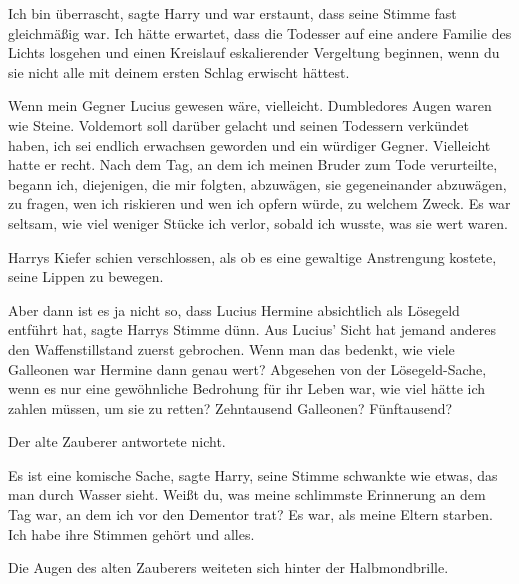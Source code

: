 \glqq{}Ich bin überrascht\grqq{}, sagte Harry und war erstaunt, dass seine Stimme
fast gleichmäßig war. \glqq{}Ich hätte erwartet, dass die Todesser auf eine
andere Familie des Lichts losgehen und einen Kreislauf eskalierender Vergeltung
beginnen, wenn du sie nicht alle mit deinem ersten Schlag erwischt
hättest.\grqq{}

\glqq{}Wenn mein Gegner Lucius gewesen wäre, vielleicht.\grqq{} Dumbledores Augen
waren wie Steine. \glqq{}Voldemort soll darüber gelacht und seinen Todessern
verkündet haben, ich sei endlich erwachsen geworden und ein würdiger Gegner.
Vielleicht hatte er recht. Nach dem Tag, an dem ich meinen Bruder zum Tode
verurteilte, begann ich, diejenigen, die mir folgten, abzuwägen, sie
gegeneinander abzuwägen, zu fragen, wen ich riskieren und wen ich opfern würde,
zu welchem Zweck. Es war seltsam, wie viel weniger Stücke ich verlor, sobald ich
wusste, was sie wert waren.\grqq{}

Harrys Kiefer schien verschlossen, als ob es eine gewaltige Anstrengung kostete,
seine Lippen zu bewegen.

\glqq{}Aber dann ist es ja nicht so, dass Lucius Hermine absichtlich als Lösegeld
entführt hat\grqq{}, sagte Harrys Stimme dünn. \glqq{}Aus Lucius' Sicht hat
jemand anderes den Waffenstillstand zuerst gebrochen. Wenn man das bedenkt, wie
viele Galleonen war Hermine dann genau wert? Abgesehen von der Lösegeld-Sache,
wenn es nur eine gewöhnliche Bedrohung für ihr Leben war, wie viel hätte ich
zahlen müssen, um sie zu retten? Zehntausend Galleonen? Fünftausend?\grqq{}

Der alte Zauberer antwortete nicht.

\glqq{}Es ist eine komische Sache\grqq{}, sagte Harry, seine Stimme schwankte wie
etwas, das man durch Wasser sieht. \glqq{}Weißt du, was meine schlimmste
Erinnerung an dem Tag war, an dem ich vor den Dementor trat? Es war, als meine
Eltern starben. Ich habe ihre Stimmen gehört und alles.\grqq{}

Die Augen des alten Zauberers weiteten sich hinter der Halbmondbrille.

